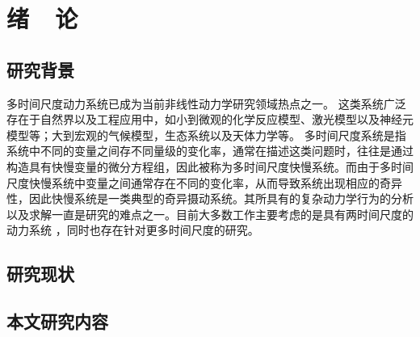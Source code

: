 \chapter{绪~~论}
\section{研究背景}
多时间尺度动力系统已成为当前非线性动力学研究领域热点之一。 这类系统广泛存在于自然界以及工程应用中，如小到微观的化学反应模型、激光模型以及神经元模型等；大到宏观的气候模型，生态系统以及天体力学等。 多时间尺度系统是指系统中不同的变量之间存不同量级的变化率，通常在描述这类问题时，往往是通过构造具有快慢变量的微分方程组，因此被称为多时间尺度快慢系统。而由于多时间尺度快慢系统中变量之间通常存在不同的变化率，从而导致系统出现相应的奇异性，因此快慢系统是一类典型的奇异摄动系统。其所具有的复杂动力学行为的分析以及求解一直是研究的难点之一。目前大多数工作主要考虑的是具有两时间尺度的动力系统
，同时也存在针对更多时间尺度的研究。



\section{研究现状}

\section{本文研究内容}

\newpage
\mbox{}
\newpage 